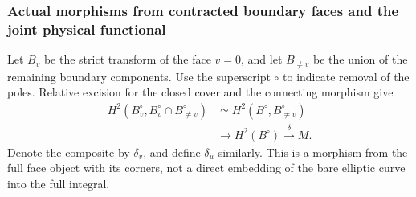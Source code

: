 \documentclass[11pt,a4paper,oneside]{article}
\theoremstyle{plain}
\theoremstyle{definition}
\theoremstyle{remark}
\numberwithin{equation}{section}
\begin{document}
\subsubsection{Actual morphisms from contracted boundary faces and the joint physical functional}
Let $B_v$ be the strict transform of the face $v=0$, and let $B_{\ne v}$ be the union of the remaining boundary components.
Use the superscript $\circ$ to indicate removal of the poles. Relative excision for the closed cover and the connecting morphism give
\begin{equation}\label{unified:eq:facemap}
\begin{split}
 H^2(B_v^\circ,B_v^\circ\cap B_{\ne v}^\circ)
 &\simeq H^2(B^\circ,B_{\ne v}^\circ)\\
 &\longrightarrow H^2(B^\circ)
 \overset\delta\longrightarrow M.
\end{split}
\end{equation}
Denote the composite by $\delta_v$, and define $\delta_u$ similarly.
This is a morphism from the full face object with its corners, not a direct embedding of the bare elliptic curve into the full integral.
\end{document}
